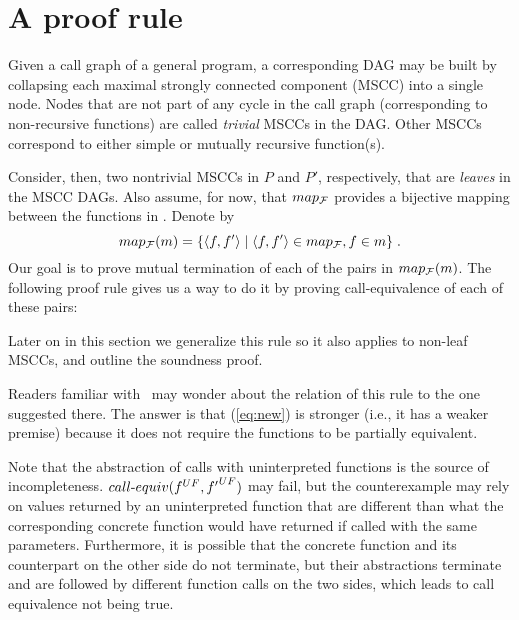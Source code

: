 \section{A proof rule}
\label{sec:rule}
Given a call graph of a general program, a corresponding DAG may be built by collapsing each maximal strongly connected
component (MSCC) into a single node. Nodes that are not part of any cycle in
the call graph (corresponding to non-recursive functions) are called
\emph{trivial} MSCCs in the DAG. Other MSCCs correspond to either simple or
mutually recursive function(s).

Consider, then, two nontrivial MSCCs  in $P$ and $P'$, respectively,
that are \emph{leaves} in the MSCC DAGs.
Also  assume, for now, that $map_{\cal F}$ provides a bijective mapping between the functions in . Denote by
\[ map_{\cal F}(m) = \{\langle f,f'\rangle  \mid \langle f,f'\rangle \in map_{\cal F}, f \in m\}\;.\]
%
Our goal is to prove mutual termination of each of the pairs in $map_{\cal F}(m)$. The
following proof rule gives us a way to do it by proving
call-equivalence of each of these pairs:
\begin{center}
\end{center}
%
Later on in this section we generalize this rule so it also applies to non-leaf MSCCs,
and outline the soundness proof.

%
Readers familiar with~\cite{GS08} may wonder about the relation of this rule to the one suggested there. The answer is that (\ref{eq:new}) is stronger (i.e., it has a weaker premise) because it does not require the functions to be partially equivalent.

Note that the abstraction of calls with uninterpreted functions is the source of incompleteness. $call\mbox{-}equiv({f}^{UF}, {f'}^{UF})$ may fail, but the counterexample may rely on values returned by an uninterpreted function that are different than what the corresponding concrete function would have returned if called with the same parameters. Furthermore, it is possible that the concrete function and its counterpart on the other side do not terminate, but their abstractions terminate and are followed by different function calls on the two sides, which leads to call equivalence not being true.



